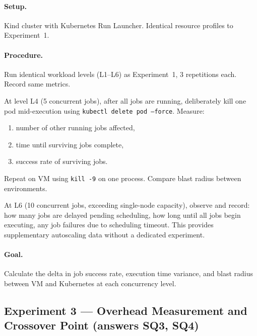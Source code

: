 \paragraph{Setup.} Kind cluster with Kubernetes Run Launcher. Identical resource profiles to Experiment~1.

\paragraph{Procedure.}

\begin{description}[style=nextline]
  \item[Part A --- Isolation comparison]
  Run identical workload levels (L1--L6) as Experiment~1, 3 repetitions each. Record same metrics.

  \item[Part B --- Blast radius test (folded in)]
  At level L4 (5 concurrent jobs), after all jobs are running, deliberately kill one pod mid-execution using \texttt{kubectl delete pod --force}. Measure:
  \begin{enumerate}[label=(\alph*)]
    \item number of other running jobs affected,
    \item time until surviving jobs complete,
    \item success rate of surviving jobs.
  \end{enumerate}
  Repeat on VM using \texttt{kill -9} on one process. Compare blast radius between environments.

  \item[Part C --- Spike observation (folded in)]
  At L6 (10 concurrent jobs, exceeding single-node capacity), observe and record: how many jobs are delayed pending scheduling, how long until all jobs begin executing, any job failures due to scheduling timeout. This provides supplementary autoscaling data without a dedicated experiment.
\end{description}

\paragraph{Goal.} Calculate the delta in job success rate, execution time variance, and blast radius between VM and Kubernetes at each concurrency level.

\subsection{Experiment 3 --- Overhead Measurement and Crossover Point (answers SQ3, SQ4)}
\label{subsec:exp3}

